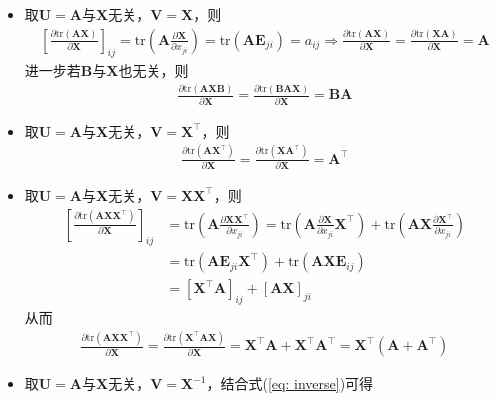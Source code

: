 \documentclass{ctexart}
\theoremstyle{definition}
\def \Av {\mathbf{A}}
\def \Bv {\mathbf{B}}
\def \Ev {\mathbf{E}}
\def \Uv {\mathbf{U}}
\def \Vv {\mathbf{V}}
\def \Xv {\mathbf{X}}
\def \tr {\mathrm{tr}}
\begin{document}
\begin{itemize}
    \item 取$\Uv = \Av$与$\Xv$无关，$\Vv = \Xv$，则
          \begin{align*}
              \left[ \frac{\partial \tr(\Av \Xv)}{\partial \Xv} \right]_{ij} = \tr \left( \Av \frac{\partial \Xv}{\partial x_{ji}} \right) = \tr ( \Av \Ev_{ji} ) = a_{ij} \Longrightarrow \frac{\partial \tr(\Av \Xv)}{\partial \Xv} = \frac{\partial \tr(\Xv \Av)}{\partial \Xv} = \Av
          \end{align*}
          进一步若$\Bv$与$\Xv$也无关，则
          \begin{align*}
              \frac{\partial \tr(\Av \Xv \Bv)}{\partial \Xv} = \frac{\partial \tr(\Bv \Av \Xv)}{\partial \Xv} = \Bv \Av
          \end{align*}
    \item 取$\Uv = \Av$与$\Xv$无关，$\Vv = \Xv^\top$，则
          \begin{align*}
              \frac{\partial \tr(\Av \Xv^\top)}{\partial \Xv} = \frac{\partial \tr(\Xv \Av^\top)}{\partial \Xv} = \Av^\top
          \end{align*}
    \item 取$\Uv = \Av$与$\Xv$无关，$\Vv = \Xv \Xv^\top$，则
          \begin{align*}
              \left[ \frac{\partial \tr(\Av \Xv \Xv^\top)}{\partial \Xv} \right]_{ij} & = \tr \left( \Av \frac{\partial \Xv \Xv^\top}{\partial x_{ji}} \right) = \tr \left( \Av \frac{\partial \Xv}{\partial x_{ji}} \Xv^\top \right) + \tr \left( \Av \Xv \frac{\partial \Xv^\top}{\partial x_{ji}} \right) \\
                                                                                      & = \tr(\Av \Ev_{ji} \Xv^\top) + \tr(\Av \Xv \Ev_{ij})                                                                                                                                                                 \\
                                                                                      & = [\Xv^\top \Av]_{ij} + [\Av \Xv]_{ji}
          \end{align*}
          从而
          \begin{align*}
              \frac{\partial \tr(\Av \Xv \Xv^\top)}{\partial \Xv} = \frac{\partial \tr(\Xv^\top \Av \Xv)}{\partial \Xv} = \Xv^\top \Av + \Xv^\top \Av^\top = \Xv^\top (\Av + \Av^\top)
          \end{align*}
    \item 取$\Uv = \Av$与$\Xv$无关，$\Vv = \Xv^{-1}$，结合式(\ref{eq: inverse})可得

\end{itemize}
\end{document}
